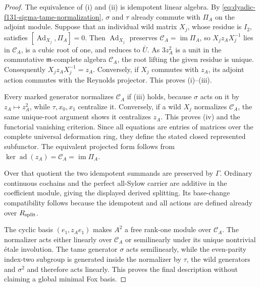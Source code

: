 \documentclass[11pt]{article}
\theoremstyle{definition}
\begin{document}
\begin{proof}
The equivalence of (i)
and (ii) is idempotent
linear algebra.
By
\eqref{eq:dyadic-f131-sigma-tame-normalization},
$\sigma$ and $\tau$
already commute with
$\Pi_A$ on the adjoint
module.
Suppose that an individual
wild matrix $X_j$, whose
residue is $I_2$, satisfies
$[\operatorname{Ad}_{X_j},\Pi_A]=0$.
Then $\operatorname{Ad}_{X_j}$
preserves
$\mathcal C_A=\operatorname{im}\Pi_A$,
so $X_j z_A X_j^{-1}$
lies in $\mathcal C_A$,
is a cubic root of one,
and reduces to $\bar U$.
As $3z_A^2$ is a unit
in the commutative
$\mathfrak m$-complete
algebra $\mathcal C_A$,
the root lifting the given
residue is unique.
Consequently
$X_jz_AX_j^{-1}=z_A$.
Conversely, if $X_j$
commutes with $z_A$,
its adjoint action
commutes with the
Reynolds projector.
This proves (i)--(iii).

Every marked generator
normalizes $\mathcal C_A$
if (iii) holds, because
$\sigma$ acts on it by
$z_A\mapsto z_A^2$,
while $\tau,x_0,x_1$
centralize it.
Conversely, if a wild
$X_j$ normalizes
$\mathcal C_A$, the
same unique-root argument
shows it centralizes $z_A$.
This proves (iv) and the
functorial vanishing
criterion.
Since all equations are
entries of matrices over
the complete universal
deformation ring,
they define the stated
closed represented subfunctor.
The equivalent projected
form follows from
$\ker\operatorname{ad}(z_A)
=\mathcal C_A=\operatorname{im}\Pi_A$.

Over that quotient the two
idempotent summands are
preserved by $\Gamma$.
Ordinary continuous cochains
and the perfect all-Sylow
carrier are additive in
the coefficient module,
giving the displayed
derived splitting.
Its base-change
compatibility follows
because the idempotent and
all actions are defined
already over $R_{\rm split}$.

The cyclic basis
$(e_1,z_Ae_1)$ makes
$A^2$ a free rank-one
module over $\mathcal C_A$.
The normalizer acts either
linearly over $\mathcal C_A$
or semilinearly under its
unique nontrivial étale
involution.  The tame
generator $\sigma$ acts
semilinearly, while the
even-parity index-two
subgroup is generated
inside the normalizer
by $\tau$, the wild
generators and
$\sigma^2$ and therefore
acts linearly.
This proves the final
description without
claiming a global
minimal Fox basis.
\end{proof}
\end{document}
